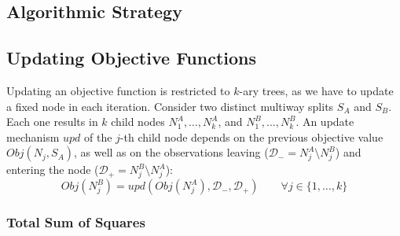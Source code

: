 \documentclass[a4paper, 11pt]{article}
\newcommand{\Data}{\mathcal{D}}
\begin{document}
\subsection{Algorithmic Strategy}




\subsection{Updating Objective Functions}

Updating an objective function is restricted to $k$-ary trees, as we have to update a fixed node in each iteration. Consider two distinct multiway splits $S_A$ and $S_B$. Each one results in $k$ child nodes $N_1^A, \dots, N_k^A$, and $N_1^B, \dots, N_k^B$. An update mechanism $upd$ of the $j$-th child node depends on the previous objective value $Obj(N_j, S_A)$, as well as on the observations leaving ($\Data_{-} = N_j^A \setminus N_j^B$) and entering the node ($\Data_{+} = N_j^B \setminus N_j^A$):
$$
Obj(N_j^B) = upd(Obj(N_j^A), \Data_{-}, \Data_{+}) \qquad \forall j \in \{1, \dots, k\}
$$

\subsubsection{Total Sum of Squares}
\end{document}
